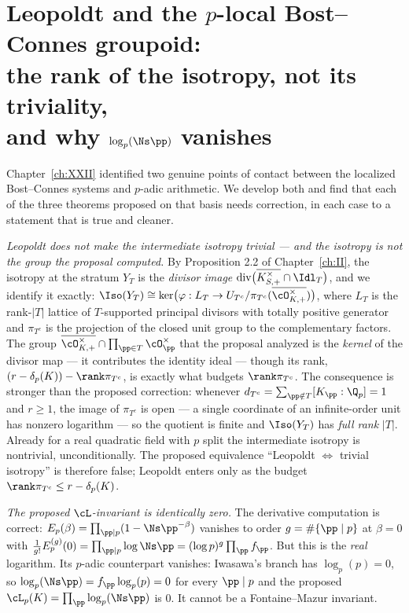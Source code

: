 \chapter[Leopoldt, the strata, and $\log_p(\Ns\pp)=0$]{Leopoldt and the $p$-local Bost--Connes groupoid:\\ the rank of the isotropy, not its triviality,\\ and why $\log_p(\Ns\pp)$ vanishes}\label{ch:XXIII}
\begin{summary}
Chapter~\ref{ch:XXII} identified two genuine points of contact between the localized
Bost--Connes systems and $p$-adic arithmetic. We develop both and find that each of the three
theorems proposed on that basis needs correction, in each case to a statement that is true and
cleaner.

\emph{Leopoldt does not make the intermediate isotropy trivial --- and the isotropy is not
the group the proposal computed.} By Proposition 2.2 of Chapter~\ref{ch:II}, the isotropy
at the stratum $Y_T$ is the \emph{divisor image}
$\mathrm{div}\bigl(\overline{K^\times_{S,+}}\cap\Idl_T\bigr)$, and we identify it exactly:
$\Iso(Y_T)\cong\ker\bigl(\varphi:L_T\to U_{T^c}/\pi_{T^c}(\overline{\cO^\times_{K,+}})\bigr)$,
where $L_T$ is the rank-$|T|$ lattice of $T$-supported principal divisors with totally
positive generator and $\pi_{T^c}$ is the projection of the closed unit group to the
complementary factors. The group $\overline{\cO^\times_{K,+}}\cap\prod_{\pp\in T}\cO_\pp^\times$
that the proposal analyzed is the \emph{kernel} of the divisor map --- it contributes the
identity ideal --- though its rank, $(r-\delta_p(K))-\rank\pi_{T^c}$, is exactly what budgets
$\rank\pi_{T^c}$. The consequence is stronger than the proposed correction: whenever
$d_{T^c}=\sum_{\pp\notin T}[K_\pp:\Q_p]=1$ and $r\ge1$, the image of $\pi_{T^c}$ is open ---
a single coordinate of an infinite-order unit has nonzero logarithm --- so the quotient is
finite and $\Iso(Y_T)$ has \emph{full rank} $|T|$. Already for a real quadratic field with
$p$ split the intermediate isotropy is nontrivial, unconditionally. The proposed equivalence
``Leopoldt $\iff$ trivial isotropy'' is therefore false; Leopoldt enters only as the budget
$\rank\pi_{T^c}\le r-\delta_p(K)$.

\emph{The proposed $\cL$-invariant is identically zero.} The derivative computation is
correct: $E_p(\beta)=\prod_{\pp\mid p}(1-\Ns\pp^{-\beta})$ vanishes to order $g=\#\{\pp\mid p\}$
at $\beta=0$ with
$\frac{1}{g!}E_p^{(g)}(0)=\prod_{\pp\mid p}\log\Ns\pp=(\log p)^g\prod_\pp f_\pp$. But this is
the \emph{real} logarithm. Its $p$-adic counterpart vanishes: Iwasawa's branch has
$\log_p(p)=0$, so $\log_p(\Ns\pp)=f_\pp\log_p(p)=0$ for every $\pp\mid p$ and the proposed
$\cL_p(K)=\prod_\pp\log_p(\Ns\pp)$ is $0$. It cannot be a Fontaine--Mazur invariant.


\end{summary}
